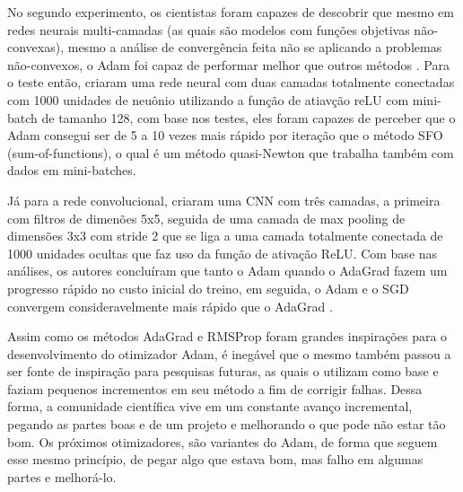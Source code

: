 No segundo experimento, os cientistas foram capazes de descobrir que mesmo em redes neurais multi-camadas (as quais são modelos com funções objetivas não-convexas), mesmo a análise de convergência feita não se aplicando a problemas não-convexos, o Adam foi capaz de performar melhor que outros métodos \parencite{AdamMethod}. Para o teste então, \textcite{AdamMethod} criaram uma rede neural com duas camadas totalmente conectadas com 1000 unidades de neuônio utilizando a função de atiavção reLU com mini-batch de tamanho 128, com base nos testes, eles foram capazes de perceber que o Adam consegui ser de 5 a 10 vezes mais rápido por iteração que o método SFO (sum-of-functions), o qual é um método quasi-Newton que trabalha também com dados em mini-batches.

Já para a rede convolucional, \textcite{AdamMethod} criaram uma CNN com três camadas, a primeira com filtros de dimenões 5x5, seguida de uma camada de max pooling de dimensões 3x3 com stride 2 que se liga a uma camada totalmente conectada de 1000 unidades ocultas que faz uso da função de ativação ReLU. Com base nas análises, os autores concluíram que tanto o Adam quando o AdaGrad fazem um progresso rápido no custo inicial do treino, em seguida, o Adam e o SGD convergem consideravelmente mais rápido que o AdaGrad \parencite{AdamMethod}.

Assim como os métodos AdaGrad e RMSProp foram grandes inspirações para o desenvolvimento do otimizador Adam, é inegável que o mesmo também passou a ser fonte de inspiração para pesquisas futuras, as quais o utilizam como base e faziam pequenos incrementos em seu método a fim de corrigir falhas. Dessa forma, a comunidade científica vive em um constante avanço incremental, pegando as partes boas e de um projeto e melhorando o que pode não estar tão bom. Os próximos otimizadores, são variantes do Adam, de forma que seguem esse mesmo princípio, de pegar algo que estava bom, mas falho em algumas partes e melhorá-lo.

